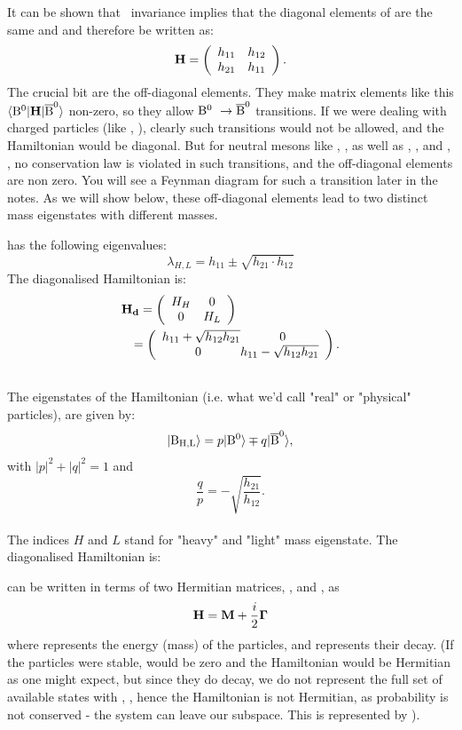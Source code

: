  It can be shown that \cpt\ invariance implies that the diagonal elements of  are the same and  and therefore be written as:
\begin{equation}
\mathbf{H}= \left( \begin{array}{cc} h_{11} & h_{12} \\ h_{21} & h_{11} \end{array} \right).
\end{equation}
The crucial bit are the off-diagonal elements. They make matrix elements like this $ \langle {\rm B^0} |
\mathbf{H} | {\rm \overline{B}^0} \rangle$ non-zero, so they allow ${\rm B^0}\ \to {\rm \overline{B}^0}$ transitions. If we were dealing with charged particles (like \Bp, \Bm), clearly such transitions would not be allowed, and the Hamiltonian would be diagonal. But for neutral mesons like \Bo, \Bob, as well as \Ko, \Kob, and \Do, \Dob, no conservation law is violated in such transitions, and the off-diagonal elements are non zero. You will see a Feynman diagram for such a transition later in the notes. As we will show below, these off-diagonal elements lead to two distinct mass eigenstates with different masses.

  has the following eigenvalues:
\begin{equation}
\lambda_{H,L}=h_{11}\pm \sqrt{h_{21}\cdot h_{12}}
\end{equation}
The diagonalised Hamiltonian is:
\begin{eqnarray}
%
\lefteqn{\op{H_d} = \mII{H_H}{0}{0}{H_L} }\nonumber\\
         & &
= \mII{h_{11} + \sqrt{h_{12} h_{21}}\!\!\!}{0}
    {0}{\!\!\!h_{11} - \sqrt{h_{12} h_{21}}}
.
\nonumber\\
\mbox{}
\end{eqnarray}
 The eigenstates of the Hamiltonian (i.e. what we'd call "real" or "physical" particles), are given by:
\begin{equation}
\label{eq:th.a.def_Bl_Bh}
 | {\rm B_{H,L}} \rangle = p  | {\rm B^0} \rangle \mp q  | {\rm \overline{B}^0} \rangle,
\end{equation}
with $|p|^2 + |q|^2 = 1$ and
\begin{equation}
\frac{q}{p}= -\sqrt{\frac{h_{21}}{h_{12}}}.
\end{equation}\\
The indices $H$ and $L$ stand for "heavy" and "light" mass eigenstate.
 The diagonalised Hamiltonian  is:
 
 can be written in terms of two Hermitian matrices, , and \op{\Gamma}, as
\begin{equation}
\mathbf{H}= \mathbf{M} + \frac{i}{2} \mathbf{\Gamma}
\end{equation}
where  represents the energy (mass) of the particles, and \op{\Gamma} represents their decay.
(If the particles were stable, \op{\Gamma} would be zero and the Hamiltonian would be Hermitian as one might expect, but since they do decay, we do not represent the full set of available states with \Bo, \Bob, hence the Hamiltonian is not Hermitian, as probability is not conserved - the system can leave our subspace. This is represented by \op{\Gamma}).

